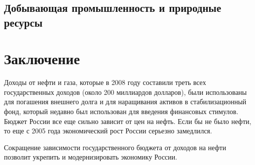 \documentclass[a4paper,12pt]{article}
\begin{document}
\subsection{Добывающая промышленность и природные ресурсы}


\section{Заключение}
Доходы от нефти и газа, которые в 2008 году составили треть всех государственных
доходов (около 200 миллиардов долларов), были использованы для погашения 
внешнего долга и для наращивания активов в стабилизационный фонд, который
недавно был использован для введения финансовых стимулов. Бюджет России все
еще сильно зависит от цен на нефть. Если бы не было нефти, то еще с 2005 года
экономический рост России серьезно замедлился.

Сокращение зависимости государственного бюджета от доходов на нефти
позволит укрепить и модернизировать экономику России.


{}   %
\end{document}
